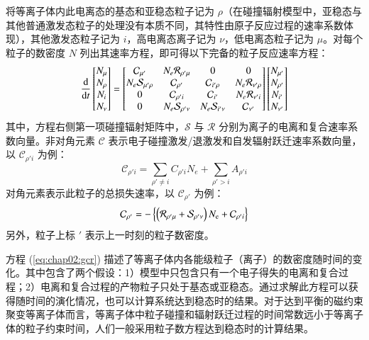 将等离子体内此电离态的基态和亚稳态粒子记为 $\rho$（在碰撞辐射模型中，亚稳态与其他普通激发态粒子的处理没有本质不同，其特性由原子反应过程的速率系数体现），其他激发态粒子记为 $i$，高电离态离子记为 $\nu$，低电离态粒子记为 $\mu$。对每个粒子的数密度 $N$ 列出其速率方程，即可得以下完备的粒子反应速率方程\cite{Summers2006}：
\begin{equation}
\label{eq:chap02:gcr}
\frac{{\rm d}}{{\rm d}t}
\begin{bmatrix}N_\mu\\ N_\rho\\ N_i\\ N_\nu\end{bmatrix}
=
\begin{bmatrix}
	\mathcal{C}_{\mu'} 	& N_e\mathcal{R}_{\rho'\mu} & 0 & 0 \\
	N_e\mathcal{S}_{\mu'\rho} & \mathcal{C}_{\rho'} & \mathcal{C}_{i'\rho} & N_e\mathcal{R}_{\nu'\rho} \\
	0 & \mathcal{C}_{\rho'i} & \mathcal{C}_{i'} & N_e\mathcal{R}_{\nu'i} \\
	0 & N_e\mathcal{S}_{\rho'\nu} & N_e\mathcal{S}_{i'\nu} & \mathcal{C}_{\nu'}
\end{bmatrix}
\begin{bmatrix}
	N_{\mu'}\\ N_{\rho'}\\ N_{i'}\\ N_{\nu'}
\end{bmatrix}
\end{equation}
其中，方程右侧第一项碰撞辐射矩阵中，$\mathcal{S}$ 与 $\mathcal{R}$ 分别为离子的电离和复合速率系数向量。非对角元素 $\mathcal{C}$ 表示电子碰撞激发/退激发和自发辐射跃迁速率系数向量，以 $\mathcal{C}_{\rho'i}$ 为例：
\begin{equation}
  \mathcal{C}_{\rho'i}=\sum_{\rho'\ne i}C_{\rho'i}N_e+\sum_{\rho'>i}A_{\rho'i}
\end{equation}
对角元素表示此粒子的总损失速率，以 $\mathcal{C}_{\rho'}$ 为例：
\begin{equation}
  \mathcal{C}_{\rho'}=-\left\{\left(\mathcal{R}_{\rho'\mu}+\mathcal{S}_{\rho'\nu}\right)N_{\rm e}+\mathcal{C}_{\rho'i}\right\}
\end{equation}
另外，粒子上标 $'$ 表示上一时刻的粒子数密度。

方程 (\ref{eq:chap02:gcr}) 描述了等离子体内各能级粒子（离子）的数密度随时间的变化。其中包含了两个假设：1）模型中只包含只有一个电子得失的电离和复合过程；2）电离和复合过程的产物粒子只处于基态或亚稳态。通过求解此方程可以获得随时间的演化情况，也可以计算系统达到稳态时的结果。对于达到平衡的磁约束聚变等离子体而言，等离子体中粒子碰撞和辐射跃迁过程的时间常数远小于等离子体的粒子约束时间，人们一般采用粒子数方程达到稳态时的计算结果。


